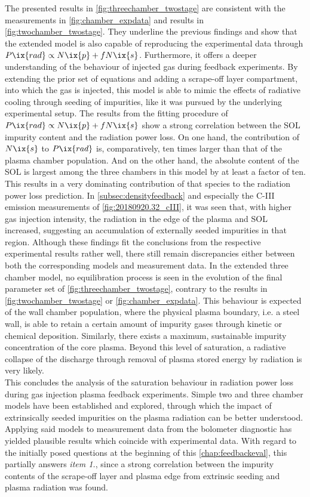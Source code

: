             The presented results in \cref{fig:threechamber_twostage} are consistent with the measurements in \cref{fig:chamber_expdata} and results in \cref{fig:twochamber_twostage}. They underline the previous findings and show that the extended model is also capable of reproducing the experimental data through $P\ix{rad}\propto N\ix{p}+fN\ix{s}$. Furthermore, it offers a deeper understanding of the behaviour of injected gas during feedback experiments. By extending the prior set of equations and adding a scrape-off layer compartment, into which the gas is injected, this model is able to  mimic the effects of radiative cooling through seeding of impurities, like it was pursued by the underlying experimental setup. The results from the fitting procedure of $P\ix{rad}\propto N\ix{p}+fN\ix{s}$ show a strong correlation between the SOL impurity content and the radiation power loss. On one hand, the contribution of $N\ix{s}$ to $P\ix{rad}$ is, comparatively, ten times larger than that of the plasma chamber population. And on the other hand, the absolute content of the SOL is largest among the three chambers in this model by at least a factor of ten. This results in a very dominating contribution of that species to the radiation power loss prediction. In \cref{subsec:densityfeedback} and especially the C-III emission measurements of \cref{fig:20180920.32_cIII}, it was seen that, with higher gas injection intensity, the radiation in the edge of the plasma and SOL increased, suggesting an accumulation of externally seeded impurities in that region. Although these findings fit the conclusions from the respective experimental results rather well, there still remain discrepancies either between both the corresponding models and measurement data. In the extended three chamber model, no equilibration process is seen in the evolution of the final parameter set of \cref{fig:threechamber_twostage}, contrary to the results in \cref{fig:twochamber_twostage} or \cref{fig:chamber_expdata}. This behaviour is expected of the wall chamber population, where the physical plasma boundary, i.e. a steel wall, is able to retain a certain amount of impurity gases through kinetic or chemical deposition\cite{Winter1992}. Similarly, there exists a maximum, sustainable impurity concentration of the core plasma. Beyond this level of saturation, a radiative collapse of the discharge through removal of plasma stored energy by radiation is very likely\cite{Zhang2021_2}.\\%
%
            \newline%
            This concludes the analysis of the saturation behaviour in radiation power loss during gas injection plasma feedback experiments. Simple two and three chamber models have been established and explored, through which the impact of extrinsically seeded impurities on the plasma radiation can be better understood. Applying said models to measurement data from the bolometer diagnostic has yielded plausible results which coincide with experimental data. With regard to the initially posed questions at the beginning of this \cref{chap:feedbackeval}, this partially answers \textit{item 1.}, since a strong correlation between the impurity contents of the scrape-off layer and plasma edge from extrinsic seeding and plasma radiation was found.%
%
